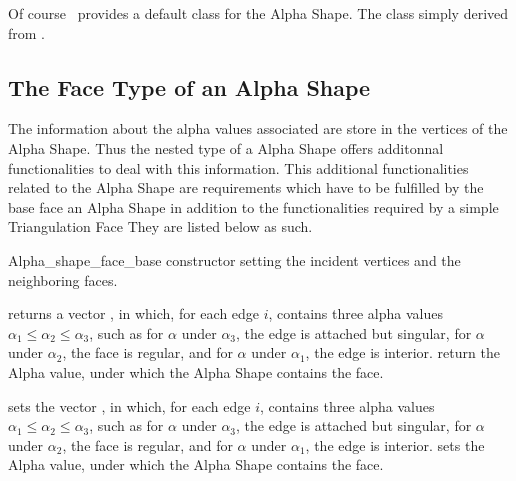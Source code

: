 Of course  \cgal\ provides a default  class
for the Alpha Shape. The class
 simply derived from 
.


\subsection{The Face Type of an Alpha Shape} 

The information about the alpha values associated  are store in the 
vertices of the Alpha Shape. Thus the nested 
type of a Alpha Shape offers additonnal functionalities to deal with this information.
This additional functionalities related to the Alpha Shape
are requirements which have to be fulfilled
by the base face  an Alpha Shape
in addition to the functionalities required by a simple Triangulation Face
They are listed below as such.



\begin{ccClass}{Alpha_shape_face_base}
\ccCreation
{}
\ccGlue
{}
\ccGlue
{} 
{constructor setting the incident vertices and the neighboring faces.}

{returns a vector , in which, for each edge $i$,  contains three alpha values $\alpha_1 \leq \alpha_2 \leq \alpha_3$, such as for
$\alpha$ under $\alpha_3$, the edge is attached but singular,
for $\alpha$ under $\alpha_2$, the face is regular, and for $\alpha$
under $\alpha_1$, the edge is interior.}
{return the Alpha value, under which the Alpha Shape contains the
face.}

\ccModifiers
{}
{sets the vector , in which, for each edge $i$,  contains three alpha values $\alpha_1 \leq \alpha_2 \leq \alpha_3$, such as for
$\alpha$ under $\alpha_3$, the edge is attached but singular,
for $\alpha$ under $\alpha_2$, the face is regular, and for $\alpha$
under $\alpha_1$, the edge is interior.}
{sets the Alpha value, under which the Alpha Shape contains the
face.}

\end{ccClass}


